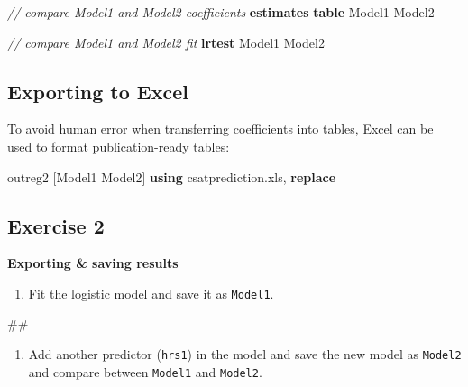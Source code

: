 \documentclass[
]{book}
\newenvironment{Shaded}{\begin{snugshade}}{\end{snugshade}}
\newcommand{\CommentTok}[1]{\textcolor[rgb]{0.56,0.35,0.01}{\textit{#1}}}
\newcommand{\KeywordTok}[1]{\textcolor[rgb]{0.13,0.29,0.53}{\textbf{#1}}}
\newcommand{\NormalTok}[1]{#1}
\providecommand{\tightlist}{%
  \setlength{\itemsep}{0pt}\setlength{\parskip}{0pt}}
\begin{document}
\begin{Shaded}
\begin{Highlighting}[]
\CommentTok{// compare Model1 and Model2 coefficients}
\KeywordTok{estimates} \KeywordTok{table}\NormalTok{ Model1 Model2}

\CommentTok{// compare Model1 and Model2 fit }
\KeywordTok{lrtest}\NormalTok{ Model1 Model2 }
\end{Highlighting}
\end{Shaded}

\hypertarget{exporting-to-excel}{%
\subsection{Exporting to Excel}\label{exporting-to-excel}}

To avoid human error when transferring coefficients into tables, Excel can be used to format publication-ready tables:

\begin{Shaded}
\begin{Highlighting}[]
\NormalTok{outreg2 [Model1 Model2] }\KeywordTok{using}\NormalTok{ csatprediction.xls, }\KeywordTok{replace}
\end{Highlighting}
\end{Shaded}

\hypertarget{exercise-2-6}{%
\subsection{Exercise 2}\label{exercise-2-6}}

\textbf{Exporting \& saving results}

\begin{enumerate}
\def\labelenumi{\arabic{enumi}.}
\tightlist
\item
  Fit the logistic model and save it as \texttt{Model1}.
\end{enumerate}

\begin{Shaded}
\begin{Highlighting}[]
\NormalTok{\#\#}
\end{Highlighting}
\end{Shaded}

\begin{enumerate}
\def\labelenumi{\arabic{enumi}.}
\setcounter{enumi}{1}
\tightlist
\item
  Add another predictor (\texttt{hrs1}) in the model and save the new model as \texttt{Model2} and compare between \texttt{Model1} and \texttt{Model2}.
\end{enumerate}
\end{document}
